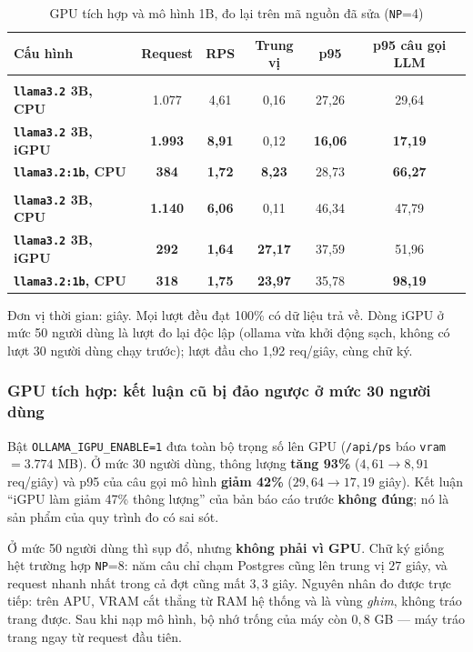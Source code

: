 \documentclass[12pt,a4paper]{article}
\newcommand{\ok}[1]{\textcolor{successgreen}{\bfseries #1}}
\newcommand{\bad}[1]{\textcolor{dangerred}{\bfseries #1}}
\begin{document}
\begin{table}[H]
\centering
\caption{GPU tích hợp và mô hình 1B, đo lại trên mã nguồn đã sửa
(\texttt{NP}=4)}
\label{tab:igpu1b}
\begin{tabularx}{\textwidth}{>{\bfseries}Xccccc}
\toprule
\rowcolor{lightblue}
Cấu hình & Request & RPS & Trung vị & p95 & p95 câu gọi LLM\\
\midrule
\multicolumn{6}{l}{\itshape Mức 30 người dùng}\\
\texttt{llama3.2} 3B, CPU & 1.077 & 4,61 & 0,16 & 27,26 & 29,64\\
\rowcolor{lightblue!60}
\textbf{\texttt{llama3.2} 3B, iGPU} & \ok{1.993} & \ok{8,91} & 0,12 & \ok{16,06} & \ok{17,19}\\
\texttt{llama3.2:1b}, CPU & \bad{384} & \bad{1,72} & \bad{8,23} & 28,73 & \bad{66,27}\\
\midrule
\multicolumn{6}{l}{\itshape Mức 50 người dùng}\\
\texttt{llama3.2} 3B, CPU & \ok{1.140} & \ok{6,06} & 0,11 & 46,34 & 47,79\\
\texttt{llama3.2} 3B, iGPU & \bad{292} & \bad{1,64} & \bad{27,17} & 37,59 & 51,96\\
\texttt{llama3.2:1b}, CPU & \bad{318} & \bad{1,75} & \bad{23,97} & 35,78 & \bad{98,19}\\
\bottomrule
\end{tabularx}

\vspace{0.15cm}
{\small Đơn vị thời gian: giây. Mọi lượt đều đạt 100\% có dữ liệu trả về. Dòng
iGPU ở mức 50 người dùng là lượt đo lại độc lập (ollama vừa khởi động sạch,
không có lượt 30 người dùng chạy trước); lượt đầu cho 1,92 req/giây, cùng chữ ký.}
\end{table}

\subsubsection*{GPU tích hợp: kết luận cũ bị đảo ngược ở mức 30 người dùng}

Bật \texttt{OLLAMA\_IGPU\_ENABLE=1} đưa toàn bộ trọng số lên GPU
(\texttt{/api/ps} báo \texttt{vram} $=3.774$ MB). Ở mức 30 người dùng, thông
lượng \textbf{tăng 93\%} ($4{,}61 \to 8{,}91$ req/giây) và p95 của câu gọi mô
hình \textbf{giảm 42\%} ($29{,}64 \to 17{,}19$ giây). Kết luận ``iGPU làm giảm
47\% thông lượng'' của bản báo cáo trước \textbf{không đúng}; nó là sản phẩm của
quy trình đo có sai sót.

Ở mức 50 người dùng thì sụp đổ, nhưng \textbf{không phải vì GPU}. Chữ ký giống
hệt trường hợp \texttt{NP}=8: năm câu chỉ chạm Postgres cũng lên trung vị $27$
giây, và request nhanh nhất trong cả đợt cũng mất $3{,}3$ giây. Nguyên nhân đo
được trực tiếp: trên APU, VRAM cắt thẳng từ RAM hệ thống và là vùng \emph{ghim},
không tráo trang được. Sau khi nạp mô hình, bộ nhớ trống của máy còn $0{,}8$ GB
--- máy tráo trang ngay từ request đầu tiên.
\end{document}
